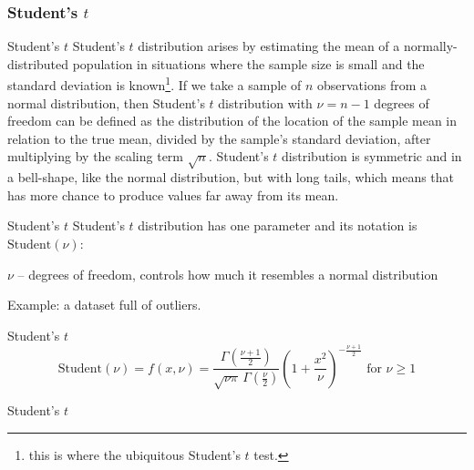 \subsubsection*{Student's $t$}
\begin{frame}[noframenumbering]{Student's $t$}
	Student's $t$ distribution arises by estimating the mean of a normally-distributed
	population in situations where the sample size is small and the standard
	deviation is known\footnote{this is where the ubiquitous Student's $t$ test.}.
	\vfill
	If we take a sample of $n$ observations from a normal distribution,
	then Student's $t$ distribution with $\nu = n-1$ degrees of freedom can
	be defined as the distribution of the location of the sample mean
	in relation to the true mean, divided by the sample's standard deviation,
	after multiplying by the scaling term $\sqrt{n}$.
	\vfill
	Student's $t$ distribution is symmetric and in a bell-shape,
	like the normal distribution, but with long tails,
	which means that has more chance to produce values far away from its mean.
\end{frame}

\begin{frame}[noframenumbering]{Student's $t$}
	Student's $t$ distribution has one parameter and its notation is
	$\text{Student}(\nu)$:
	\begin{vfilleditems}
		\item $\nu$ -- degrees of freedom, controls how much it resembles a normal distribution
	\end{vfilleditems}
	\vfill
	Example: a dataset full of outliers.
\end{frame}

\begin{frame}[noframenumbering]{Student's $t$}
	$$\text{Student}(\nu) = f(x, \nu) = \frac{\Gamma \left(\frac{\nu+1}{2} \right)} {\sqrt{\nu\pi}\,\Gamma \left(\frac{\nu}{2} \right)} \left(1+\frac{x^2}{\nu} \right)^{-\frac{\nu+1}{2}} \text{ for $\nu \geq 1$}$$
\end{frame}

\begin{frame}[noframenumbering]{Student's $t$}
	\centering
\end{frame}

